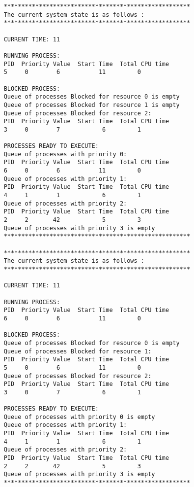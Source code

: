 \documentclass{article}
\begin{document}
\begin{verbatim}
    *****************************************************
    The current system state is as follows : 
    *****************************************************
    
    CURRENT TIME: 11

    RUNNING PROCESS:
    PID  Priority Value  Start Time  Total CPU time
    5     0        6           11         0

    BLOCKED PROCESS:
    Queue of processes Blocked for resource 0 is empty
    Queue of processes Blocked for resource 1 is empty
    Queue of processes Blocked for resource 2:
    PID  Priority Value  Start Time  Total CPU time
    3     0        7            6         1

    PROCESSES READY TO EXECUTE:
    Queue of processes with priority 0:
    PID  Priority Value  Start Time  Total CPU time
    6     0        6           11         0
    Queue of processes with priority 1:
    PID  Priority Value  Start Time  Total CPU time
    4     1        1            6         1
    Queue of processes with priority 2:
    PID  Priority Value  Start Time  Total CPU time
    2     2       42            5         3
    Queue of processes with priority 3 is empty
    *****************************************************

    *****************************************************
    The current system state is as follows : 
    *****************************************************
    
    CURRENT TIME: 11

    RUNNING PROCESS:
    PID  Priority Value  Start Time  Total CPU time
    6     0        6           11         0

    BLOCKED PROCESS:
    Queue of processes Blocked for resource 0 is empty
    Queue of processes Blocked for resource 1:
    PID  Priority Value  Start Time  Total CPU time
    5     0        6           11         0
    Queue of processes Blocked for resource 2:
    PID  Priority Value  Start Time  Total CPU time
    3     0        7            6         1

    PROCESSES READY TO EXECUTE:
    Queue of processes with priority 0 is empty
    Queue of processes with priority 1:
    PID  Priority Value  Start Time  Total CPU time
    4     1        1            6         1
    Queue of processes with priority 2:
    PID  Priority Value  Start Time  Total CPU time
    2     2       42            5         3
    Queue of processes with priority 3 is empty
    *****************************************************
\end{verbatim}
\end{document}
